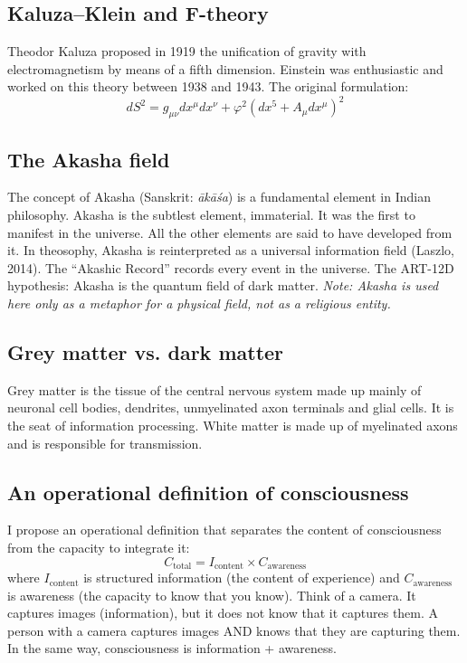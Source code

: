 \documentclass[11pt,a4paper]{article}
\begin{document}
\subsection{Kaluza--Klein and F-theory}
Theodor Kaluza proposed in 1919 the unification of gravity with electromagnetism by means of a fifth dimension. Einstein was enthusiastic and worked on this theory between 1938 and 1943. The original formulation:
\begin{equation}
dS^2 = g_{\mu\nu} dx^\mu dx^\nu + \varphi^2(dx^5 + A_{\mu} dx^\mu)^2
\end{equation}

\subsection{The Akasha field}
The concept of Akasha (Sanskrit: \emph{ākāśa}) is a fundamental element in Indian philosophy. Akasha is the subtlest element, immaterial. It was the first to manifest in the universe. All the other elements are said to have developed from it. In theosophy, Akasha is reinterpreted as a universal information field (Laszlo, 2014). The ``Akashic Record'' records every event in the universe. The ART-12D hypothesis: Akasha is the quantum field of dark matter. \textit{Note: Akasha is used here only as a metaphor for a physical field, not as a religious entity.}

\subsection{Grey matter vs. dark matter}
Grey matter is the tissue of the central nervous system made up mainly of neuronal cell bodies, dendrites, unmyelinated axon terminals and glial cells. It is the seat of information processing. White matter is made up of myelinated axons and is responsible for transmission.

\subsection{An operational definition of consciousness}
I propose an operational definition that separates the content of consciousness from the capacity to integrate it:
\begin{equation}
C_{\text{total}} = I_{\text{content}} \times C_{\text{awareness}}
\end{equation}
where $I_{\text{content}}$ is structured information (the content of experience) and $C_{\text{awareness}}$ is awareness (the capacity to know that you know). Think of a camera. It captures images (information), but it does not know that it captures them. A person with a camera captures images AND knows that they are capturing them. In the same way, consciousness is information + awareness.
\end{document}
